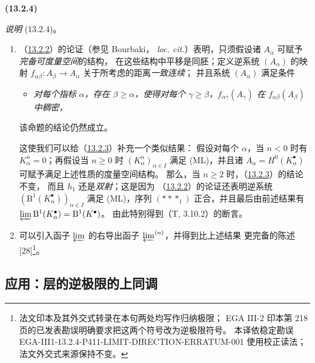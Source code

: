 \documentclass[UTF8,fontset=none,11pt,oneside,openany]{ctexbook}
\newcommand{\SourceCorrectionNote}[1]{\footnote{#1}}
\newenvironment{env}[1][]{%
  \par\medskip\noindent\textbf{(#1)}\ %
}{\par}
\let\EGAOriginalLabel\label
\renewcommand{\label}[1]{\phantomsection\EGAOriginalLabel{#1}}
\begin{document}
\begin{env}[13.2.4]
\label{0.13.2.4-fr}
\emph{说明} (13.2.4)。
\begin{enumerate}
\item[\emph{(i)}]
（\hyperref[0.13.2.2-fr]{13.2.2}）的论证（参见 Bourbaki，
\emph{loc. cit.}）表明，只须假设诸 $A_\alpha$ 可赋予\emph{完备可度量空间}的结构，
在这些结构中平移是同胚；定义逆系统 $(A_\alpha)$ 的映射
$f_{\alpha\beta}:A_\beta\to A_\alpha$ 关于所考虑的距离\emph{一致连续}；
并且系统 $(A_\alpha)$ 满足条件
\begin{itemize}
\item[\textbf{(ML')}]
\emph{对每个指标 $\alpha$，存在 $\beta\geq\alpha$，使得对每个
$\gamma\geq\beta$，$f_{\alpha\gamma}(A_\gamma)$ 在
$f_{\alpha\beta}(A_\beta)$ 中稠密，}
\end{itemize}
该命题的结论仍然成立。

这使我们可以给（\hyperref[0.13.2.3-fr]{13.2.3}）补充一个类似结果：
假设对每个 $\alpha$，当 $n<0$ 时有 $K_\alpha^n=0$；再假设当
$n\geq0$ 时 $(K_\alpha^n)_{\alpha\in I}$ 满足 (ML)，并且诸
$A_\alpha=H^0(K_\alpha^\bullet)$ 可赋予满足上述性质的度量空间结构。
那么，当 $n\geq2$ 时，（\hyperref[0.13.2.3-fr]{13.2.3}）的结论不变，
而且 $h_1$ 还是\emph{双射}；这是因为
（\hyperref[0.13.2.2-fr]{13.2.2}）的论证还表明逆系统
$(\mathrm B^1(K_\alpha^\bullet))_{\alpha\in I}$ 满足 (ML)，序列
$(***_1)$ 正合，并且最后由前述结果有
$\varprojlim\mathrm B^1(K_\alpha^\bullet)=\mathrm B^1(K^\bullet)$。
由此特别得到（T, 3.10.2）的断言。

\item[\emph{(ii)}]
可以引入函子 $\varprojlim$ 的右导出函子 $\varprojlim^{(n)}$，并得到比上述结果
更完备的陈述 [28]\SourceCorrectionNote{法文印本及其外交式转录在本句两处均写作归纳极限；
EGA III-2 印本第 218 页的已发表勘误明确要求把这两个符号改为逆极限符号。
本译依稳定勘误 EGA-III1-13.2.4-P411-LIMIT-DIRECTION-ERRATUM-001 使用校正读法；
法文外交式来源保持不变。}。
\end{enumerate}
\end{env}

\subsection{应用：层的逆极限的上同调}
\label{subsection:0.13.3-fr}
\end{document}
